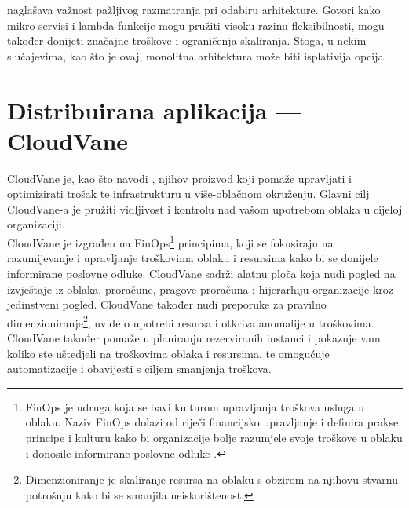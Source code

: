 \documentclass[times, utf8, diplomski]{fer}
\begin{document}
\citet{kolny_scaling_2023} naglašava važnost pažljivog razmatranja pri odabiru arhitekture. Govori kako mikro-servisi i lambda funkcije mogu pružiti visoku razinu fleksibilnosti, mogu također donijeti značajne troškove i ograničenja skaliranja. Stoga, u nekim slučajevima, kao što je ovaj, monolitna arhitektura može biti isplativija opcija.



\chapter{Distribuirana aplikacija --- CloudVane}

CloudVane je, kao što navodi \citet{neos_cloudvane_nodate}, njihov proizvod koji pomaže upravljati i optimizirati trošak te infrastrukturu u više-oblačnom  okruženju. Glavni cilj CloudVane-a je pružiti vidljivost i kontrolu nad vašom upotrebom oblaka  u cijeloj organizaciji. \\

CloudVane je izgrađen na FinOps\footnote{FinOps je udruga koja se bavi kulturom upravljanja troškova usluga u oblaku. Naziv FinOps dolazi od riječi financijsko upravljanje i definira prakse, principe i kulturu kako bi organizacije bolje razumjele svoje troškove u oblaku i donosile informirane poslovne odluke \citep{finops_fundation_finops_nodate}.} principima, koji se fokusiraju na razumijevanje i upravljanje troškovima oblaku i resursima kako bi se donijele informirane poslovne odluke. CloudVane sadrži alatnu ploča  koja nudi pogled na izvještaje iz oblaka, proračune, pragove proračuna i hijerarhiju organizacije kroz jedinstveni pogled. CloudVane također nudi preporuke za pravilno dimenzioniranje\footnote{Dimenzioniranje je skaliranje resursa na oblaku s obzirom na njihovu stvarnu potrošnju kako bi se smanjila neiskorištenost.}, uvide o upotrebi resursa i otkriva anomalije u troškovima. CloudVane također pomaže u planiranju rezerviranih instanci i pokazuje vam koliko ste uštedjeli na troškovima oblaka i resursima, te omogućuje automatizacije i obavijesti s ciljem smanjenja troškova. \\
\end{document}
